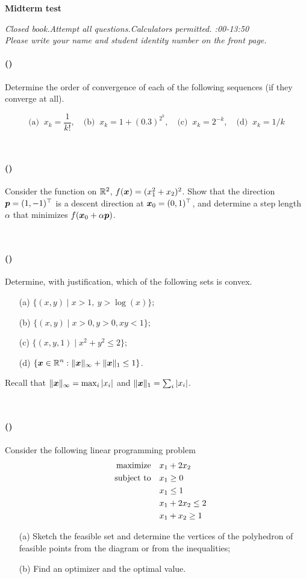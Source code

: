 \documentclass{article}
\newcounter{problems}
\renewcommand{\problem}[1]{\paragraph{(\theproblems)}\addtocounter{problems}{1}\label{#1}}
\newcommand{\marks}[2][0mm]{\hspace{30mm}\mbox{}\vskip #1\hspace{-30mm}\hfill{\sf [#2 marks]}\\[-\baselineskip]}
\renewcommand{\marks}[2][0mm]{\hspace{30mm}\mbox{}\vskip #1\hspace{-30mm}\hfill{\sf [#2 marks]}\\[-\baselineskip]}
\begin{document}
 
\begin{center}
{\Large {\bf Midterm test}}
\end{center}

\begin{center} 
\emph{Closed book.\quad Attempt all questions.\quad Calculators permitted. :00-13:50}\\
{\em Please write your name and student identity number on the front page.}
\end{center}

\problem{p0} Determine the order of convergence of each of the following sequences (if they converge at all).

\begin{equation*}
 \text{(a) } \ x_k = \frac{1}{k!}, \quad \text{(b) } \ x_k = 1+(0.3)^{2^k}, \quad \text{(c) } \ x_k=2^{-k}, \quad \text{(d) } \ x_k = 1/k
\end{equation*}

\marks[-6mm]{4}

\newpage
\mbox{}
\newpage

\problem{p1} Consider the function on $\mathbb{R}^2$, $f(\bm{x}) = (x_1^2+x_2)^2$. Show that the direction $\bm{p}=(1,-1)^{\top}$ is a descent direction at $\bm{x}_0=(0,1)^{\top}$, and determine a step length $\alpha$ that minimizes $f(\bm{x}_0+\alpha \bm{p})$. 

\marks[-6mm]{4}

\newpage
\mbox{}
\newpage

\problem{p2} Determine, with justification, which of the following sets is convex.
\begin{itemize}
 \item[(a)] $\displaystyle \{(x,y) \mid x>1, \ y>\log(x)\}$;
 \item[(b)] $\displaystyle \{(x,y) \mid x>0,y>0,xy<1\}$;
 \item[(c)] $\displaystyle \{(x,y,1) \mid x^2+y^2\leq 2\}$;
 \item[(d)] $\displaystyle \{\bm{x}\in \mathbb{R}^n \mathrel{\mathop{:}} \Vert {\bm{x}}\Vert_\infty+\Vert {\bm{x}}\Vert_1\leq 1\}$.
 \end{itemize}
Recall that $\Vert {\bm{x}}\Vert_\infty = \max_{i} |x_i|$ and $\Vert {\bm{x}}\Vert_1 = \sum_i |x_i|$.

\marks[-6mm]{4} 

\newpage
\mbox{}
\newpage

\problem{p3} Consider the following linear programming problem
\begin{align*}
 \text{maximize}\quad & x_1+2x_2 \\
 \quad\text{subject to}\quad & x_1\geq 0\\
	 & x_1\leq 1\\
         & x_1+2x_2\leq 2\\
         & x_1+x_2\geq 1
\end{align*}
\begin{itemize}
 \item[(a)] Sketch the feasible set and determine the vertices of the polyhedron of feasible points from the diagram or from the inequalities;
 \item[(b)] Find an optimizer and the optimal value.
\end{itemize}
\end{document}

